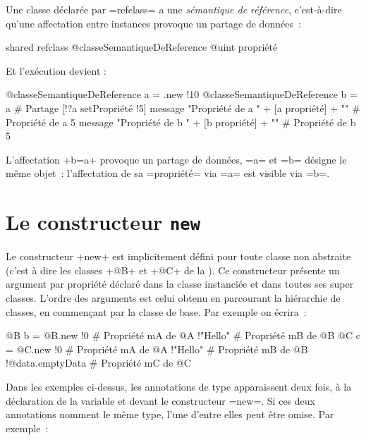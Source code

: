 
Une classe déclarée par \ggs=refclass= a une \emph{sémantique de référence}, c'est-à-dire qu'une affectation entre instances provoque un partage de données~:

\begin{galgas}
shared refclass @classeSemantiqueDeReference {
  @uint propriété
}
\end{galgas}

Et l'exécution devient :

\begin{galgas}
@classeSemantiqueDeReference a = .new {!10}
@classeSemantiqueDeReference b = a # Partage
[!?a setPropriété !5]
message "Propriété de a " + [a propriété] + "\n" # Propriété de a 5
message "Propriété de b " + [b propriété] + "\n" # Propriété de b 5
\end{galgas}

L'affectation \ggs+b=a+ provoque un partage de données, \ggs=a= et \ggs=b= désigne le même objet~: l'affectation de sa \ggs=propriété= via \ggs=a= est visible via \ggs=b=.








\section{Le constructeur \texttt{new}}

Le constructeur \ggs+new+ est implicitement défini pour toute classe non abstraite (c'est à dire les classes \ggs+@B+ et \ggs+@C+ de la ). Ce constructeur présente un argument par propriété déclaré dans la classe instanciée et dans toutes ses super classes. L'ordre des arguments est celui obtenu en parcourant la hiérarchie de classes, en commençant par la classe de base. Par exemple on écrira~:

\begin{galgas}
@B b = @B.new {
  !0 # Propriété mA de @A
  !"Hello" # Propriété mB de @B
}
@C c = @C.new {
  !0 # Propriété mA de @A
  !"Hello" # Propriété mB de @B
  !@data.emptyData # Propriété mC de @C
}
\end{galgas}

Dans les exemples ci-dessus, les annotations de type apparaissent deux fois, à la déclaration de la variable et devant le constructeur \ggs=new=. Si ces deux annotations nomment le même type, l'une d'entre elles peut être omise. Par exemple~:

